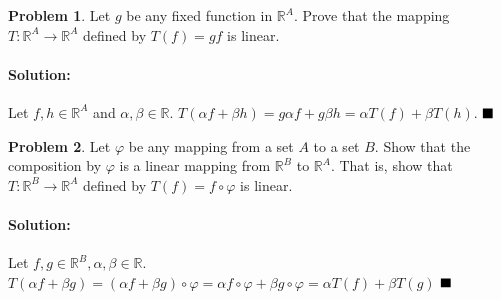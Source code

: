 \documentclass[]{article}
\newcommand{\RR}{\mathbb{R}}
\theoremstyle{definition}
\newtheorem{problem}{Problem}
\newenvironment{solution}{\paragraph{Solution:}}{\hfill$\blacksquare \\$}
\begin{document}
\begin{problem}
	Let $g$ be any fixed function in $\RR^A$. Prove that the mapping $T:\RR^A \to \RR^A$ defined by $T(f) = gf$ is linear.
\end{problem}
\begin{solution}
	Let $f,h \in \RR^A$ and $\alpha, \beta \in \RR$. $T(\alpha f + \beta h) = g \alpha f + g \beta h = \alpha T(f) +  \beta T(h)$.
\end{solution}
\begin{problem}
	Let $\varphi$ be any mapping from a set $A$ to a set $B$. Show that the composition by $\varphi$ is a linear mapping from $\RR^B$ to $\RR^A$. That is, show that $T:\RR^B \to \RR^A$ defined by $T(f) = f \circ \varphi $ is linear.	
\end{problem}
\begin{solution}
	Let $f,g \in \RR^B, \alpha, \beta \in \RR$. $T(\alpha f + \beta g) = (\alpha f + \beta g) \circ \varphi = \alpha f \circ \varphi + \beta g \circ \varphi = \alpha T(f) + \beta T(g)$
\end{solution}
\end{document}
